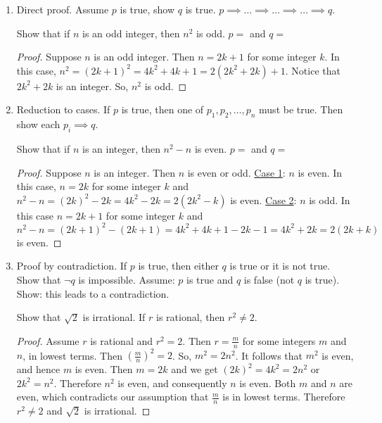 \documentclass[]{article}
\begin{document}
\begin{enumerate}
	\item Direct proof. Assume $p$ is true, show $q$ is true. $p\implies \dots \implies \dots \implies\dots \implies q$.
	\begin{example}
		Show that if $n$ is an odd integer, then $n^2$ is odd. $p = $  and $q = $ 
		\begin{proof}
			Suppose $n$ is an odd integer. Then $n = 2k+1$ for some integer $k$. In this case, $n^2 = (2k+1)^2 = 4k^2 + 4k + 1 = 2(2k^2 + 2k) + 1$. Notice that $2k^2+2k$ is an integer. So, $n^2$ is odd.
		\end{proof}
	\end{example}
	\item Reduction to cases. If $p$ is true, then one of $p_1,p_2,\dots,p_n$ must be true. Then show each $p_i \implies q$.
	\begin{example}
		Show that if $n$ is an integer, then $n^2-n$ is even. $p = $  and $q = $ \say{$n^2-n$ is even.}
		\begin{proof}
			Suppose $n$ is an integer. Then $n$ is even or odd.
			\ul{Case 1}: $n$ is even. In this case, $n=2k$ for some integer $k$ and $n^2-n = (2k)^2 - 2k = 4k^2 - 2k = 2(2k^2-k)$ is even. \ul{Case 2}: $n$ is odd. In this case $n = 2k+1$ for some integer $k$ and $n^2-n = (2k+1)^2-(2k+1) = 4k^2 + 4k + 1 - 2k -1 = 4k^2 +2k = 2(2k+k)$ is even.
		\end{proof}
	\end{example}
	\item Proof by contradiction. If $p$ is true, then either $q$ is true or it is not true. Show that $\neg q$ is impossible. Assume: $p$ is true and $q$ is false (not $q$ is true). Show: this leads to a contradiction.
	\begin{example}
		Show that $\sqrt{2}$ is irrational. If $r$ is rational, then $r^2 \neq 2$.
		\begin{proof}
			Assume $r$ is rational and $r^2 = 2$. Then $r = \frac{m}{n}$ for some integers $m$ and $n$, in lowest terms. Then $(\frac{m}{n})^2 = 2$. So, $m^2 = 2n^2$. It follows that $m^2$ is even, and hence $m$ is even. Then $m = 2k$ and we get $(2k)^2 = 4k^2 = 2n^2$ or $2k^2 = n^2$. Therefore $n^2$ is even, and consequently $n$ is even. Both $m$ and $n$ are even, which contradicts our assumption that $\frac{m}{n}$ is in lowest terms. Therefore $r^2 \neq 2$ and $\sqrt{2}$ is irrational.
		\end{proof}
	\end{example}
\end{enumerate}
\end{document}
